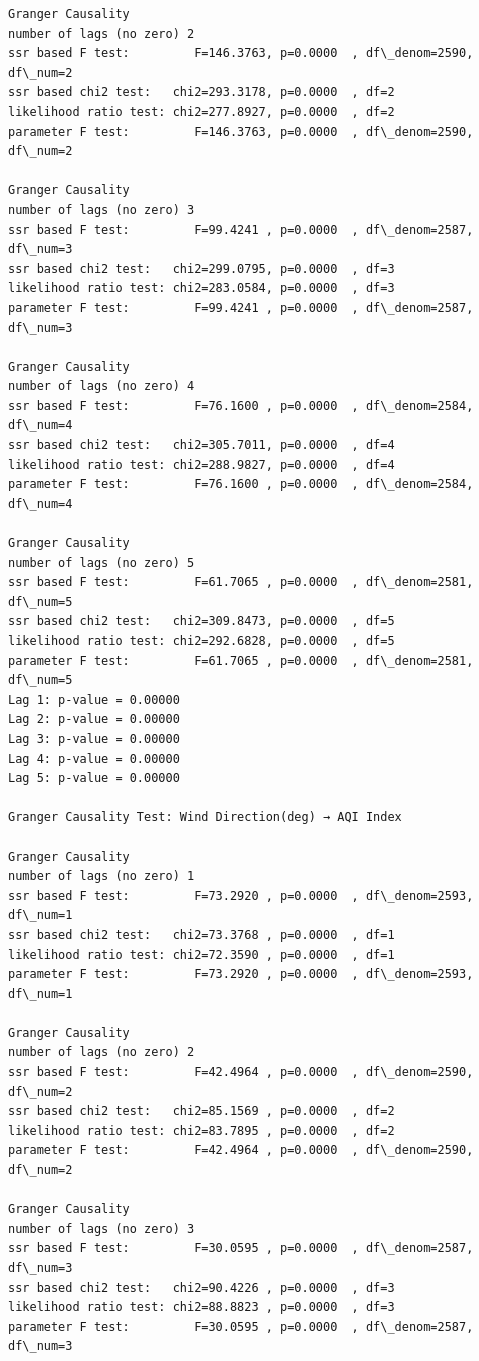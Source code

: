 \documentclass[11pt]{article}
\begin{document}
\begin{Verbatim}[commandchars=\\\{\}]
Granger Causality
number of lags (no zero) 2
ssr based F test:         F=146.3763, p=0.0000  , df\_denom=2590, df\_num=2
ssr based chi2 test:   chi2=293.3178, p=0.0000  , df=2
likelihood ratio test: chi2=277.8927, p=0.0000  , df=2
parameter F test:         F=146.3763, p=0.0000  , df\_denom=2590, df\_num=2

Granger Causality
number of lags (no zero) 3
ssr based F test:         F=99.4241 , p=0.0000  , df\_denom=2587, df\_num=3
ssr based chi2 test:   chi2=299.0795, p=0.0000  , df=3
likelihood ratio test: chi2=283.0584, p=0.0000  , df=3
parameter F test:         F=99.4241 , p=0.0000  , df\_denom=2587, df\_num=3

Granger Causality
number of lags (no zero) 4
ssr based F test:         F=76.1600 , p=0.0000  , df\_denom=2584, df\_num=4
ssr based chi2 test:   chi2=305.7011, p=0.0000  , df=4
likelihood ratio test: chi2=288.9827, p=0.0000  , df=4
parameter F test:         F=76.1600 , p=0.0000  , df\_denom=2584, df\_num=4

Granger Causality
number of lags (no zero) 5
ssr based F test:         F=61.7065 , p=0.0000  , df\_denom=2581, df\_num=5
ssr based chi2 test:   chi2=309.8473, p=0.0000  , df=5
likelihood ratio test: chi2=292.6828, p=0.0000  , df=5
parameter F test:         F=61.7065 , p=0.0000  , df\_denom=2581, df\_num=5
Lag 1: p-value = 0.00000
Lag 2: p-value = 0.00000
Lag 3: p-value = 0.00000
Lag 4: p-value = 0.00000
Lag 5: p-value = 0.00000

Granger Causality Test: Wind Direction(deg) → AQI Index

Granger Causality
number of lags (no zero) 1
ssr based F test:         F=73.2920 , p=0.0000  , df\_denom=2593, df\_num=1
ssr based chi2 test:   chi2=73.3768 , p=0.0000  , df=1
likelihood ratio test: chi2=72.3590 , p=0.0000  , df=1
parameter F test:         F=73.2920 , p=0.0000  , df\_denom=2593, df\_num=1

Granger Causality
number of lags (no zero) 2
ssr based F test:         F=42.4964 , p=0.0000  , df\_denom=2590, df\_num=2
ssr based chi2 test:   chi2=85.1569 , p=0.0000  , df=2
likelihood ratio test: chi2=83.7895 , p=0.0000  , df=2
parameter F test:         F=42.4964 , p=0.0000  , df\_denom=2590, df\_num=2

Granger Causality
number of lags (no zero) 3
ssr based F test:         F=30.0595 , p=0.0000  , df\_denom=2587, df\_num=3
ssr based chi2 test:   chi2=90.4226 , p=0.0000  , df=3
likelihood ratio test: chi2=88.8823 , p=0.0000  , df=3
parameter F test:         F=30.0595 , p=0.0000  , df\_denom=2587, df\_num=3


\end{Verbatim}
\end{document}
